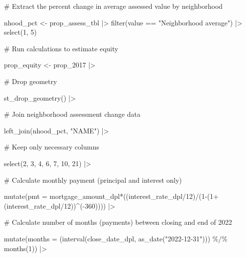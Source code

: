 \documentclass[
  letterpaper,
  DIV=11,
  numbers=noendperiod]{scrartcl}
\newenvironment{Shaded}{\begin{snugshade}}{\end{snugshade}}
\newcommand{\AttributeTok}[1]{\textcolor[rgb]{0.40,0.45,0.13}{#1}}
\newcommand{\CommentTok}[1]{\textcolor[rgb]{0.37,0.37,0.37}{#1}}
\newcommand{\DecValTok}[1]{\textcolor[rgb]{0.68,0.00,0.00}{#1}}
\newcommand{\FunctionTok}[1]{\textcolor[rgb]{0.28,0.35,0.67}{#1}}
\newcommand{\NormalTok}[1]{\textcolor[rgb]{0.00,0.23,0.31}{#1}}
\newcommand{\OtherTok}[1]{\textcolor[rgb]{0.00,0.23,0.31}{#1}}
\newcommand{\SpecialCharTok}[1]{\textcolor[rgb]{0.37,0.37,0.37}{#1}}
\newcommand{\StringTok}[1]{\textcolor[rgb]{0.13,0.47,0.30}{#1}}
\begin{document}
\begin{Shaded}
\begin{Highlighting}[]
\CommentTok{\# Extract the percent change in average assessed value by neighborhood}

\NormalTok{nhood\_pct }\OtherTok{\textless{}{-}}\NormalTok{ prop\_assess\_tbl }\SpecialCharTok{|\textgreater{}} 
  \FunctionTok{filter}\NormalTok{(value }\SpecialCharTok{==} \StringTok{"Neighborhood average"}\NormalTok{) }\SpecialCharTok{|\textgreater{}} 
  \FunctionTok{select}\NormalTok{(}\DecValTok{1}\NormalTok{, }\DecValTok{5}\NormalTok{)}

\CommentTok{\# Run calculations to estimate equity}

\NormalTok{prop\_equity }\OtherTok{\textless{}{-}}\NormalTok{ prop\_2017 }\SpecialCharTok{|\textgreater{}} 
  
  \CommentTok{\# Drop geometry}
  
  \FunctionTok{st\_drop\_geometry}\NormalTok{() }\SpecialCharTok{|\textgreater{}} 
  
  \CommentTok{\# Join neighborhood assessment change data}
  
  \FunctionTok{left\_join}\NormalTok{(nhood\_pct, }\StringTok{"NAME"}\NormalTok{) }\SpecialCharTok{|\textgreater{}} 
  
  \CommentTok{\# Keep only necessary columns}
  
  \FunctionTok{select}\NormalTok{(}\DecValTok{2}\NormalTok{, }\DecValTok{3}\NormalTok{, }\DecValTok{4}\NormalTok{, }\DecValTok{6}\NormalTok{, }\DecValTok{7}\NormalTok{, }\DecValTok{10}\NormalTok{, }\DecValTok{21}\NormalTok{) }\SpecialCharTok{|\textgreater{}}
  
  \CommentTok{\# Calculate monthly payment (principal and interest only)}
  
  \FunctionTok{mutate}\NormalTok{(}\AttributeTok{pmt =}\NormalTok{  mortgage\_amount\_dpl}\SpecialCharTok{*}\NormalTok{((interest\_rate\_dpl}\SpecialCharTok{/}\DecValTok{12}\NormalTok{)}\SpecialCharTok{/}\NormalTok{(}\DecValTok{1}\SpecialCharTok{{-}}\NormalTok{(}\DecValTok{1}\SpecialCharTok{+}\NormalTok{(interest\_rate\_dpl}\SpecialCharTok{/}\DecValTok{12}\NormalTok{))}\SpecialCharTok{\^{}}\NormalTok{(}\SpecialCharTok{{-}}\DecValTok{360}\NormalTok{)))) }\SpecialCharTok{|\textgreater{}} 
  
  \CommentTok{\# Calculate number of months (payments) between closing and end of 2022}
  
  \FunctionTok{mutate}\NormalTok{(}\AttributeTok{months =}\NormalTok{ (}\FunctionTok{interval}\NormalTok{(close\_date\_dpl, }\FunctionTok{as\_date}\NormalTok{(}\StringTok{"2022{-}12{-}31"}\NormalTok{))) }\SpecialCharTok{\%/\%} \FunctionTok{months}\NormalTok{(}\DecValTok{1}\NormalTok{)) }\SpecialCharTok{|\textgreater{}} 
  

\end{Highlighting}
\end{Shaded}
\end{document}
